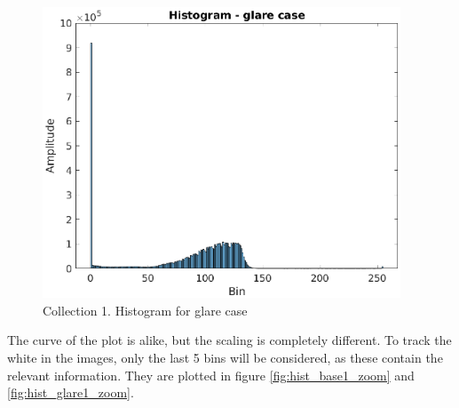 \begin{figure}[h!]
\begin{minipage}[t]{0.48\textwidth}
        \includegraphics[width=0.95\textwidth]{figures/ImageAnalysis/Histogram_glare1.eps}
        \caption{Collection 1. Histogram for glare case}
        \label{fig:hist_glare1}
    \end{minipage}
\end{figure}
The curve of the plot is alike, but the scaling is completely different. To track the white in the images, only the last 5 bins will be considered, as these contain the relevant information. They are plotted in figure \ref{fig:hist_base1_zoom} and \ref{fig:hist_glare1_zoom}.

